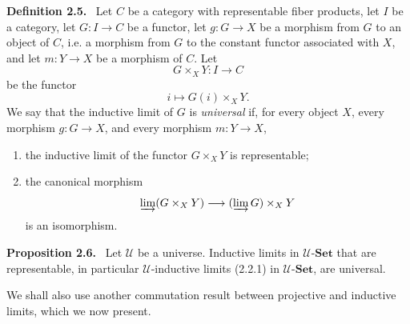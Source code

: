 \documentclass[11pt]{article}
\newcommand{\U}{\mathcal{U}}
\newcommand{\Set}{\mathbf{Set}}
\newenvironment{statement}[1]{\par\medskip\noindent\textbf{#1.}\ }{\par\medskip}
\begin{document}
\begin{statement}{Definition 2.5}
Let $C$ be a category with representable fiber products, let $I$ be a category, let $G:I\to C$ be a functor, let $g:G\to X$ be a morphism from $G$ to an object of $C$, i.e. a morphism from $G$ to the constant functor associated with $X$, and let $m:Y\to X$ be a morphism of $C$. Let
\[
G\times_XY:I\longrightarrow C
\]
be the functor
\[
i\longmapsto G(i)\times_XY.
\]
We say that the inductive limit of $G$ is \emph{universal} if, for every object $X$, every morphism $g:G\to X$, and every morphism $m:Y\to X$,
\begin{enumerate}[label=\alph*)]
\item the inductive limit of the functor $G\times_XY$ is representable;
\item the canonical morphism
\[
\varinjlim(G\times_XY)\longrightarrow (\varinjlim G)\times_XY
\]
is an isomorphism.
\end{enumerate}
\end{statement}

\begin{statement}{Proposition 2.6}
Let $\U$ be a universe. Inductive limits in $\U$-$\Set$ that are representable, in particular $\U$-inductive limits (2.2.1) in $\U$-$\Set$, are universal.
\end{statement}

We shall also use another commutation result between projective and inductive limits, which we now present.
\end{document}

